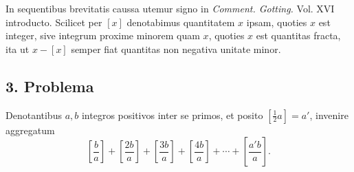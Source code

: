 \documentclass[12pt]{article}
\begin{document}
In sequentibus brevitatis caussa utemur signo in \emph{Comment. Gotting.} Vol. XVI introducto. Scilicet per $[x]$ denotabimus quantitatem $x$ ipsam, quoties $x$ est integer, sive integrum proxime minorem quam $x$, quoties $x$ est quantitas fracta, ita ut $x-[x]$ semper fiat quantitas non negativa unitate minor.

\subsection*{3. Problema}

Denotantibus $a,b$ integros positivos inter se primos, et posito $\left[\frac12a\right]=a'$, invenire aggregatum
\[
\left[\frac{b}{a}\right]+\left[\frac{2b}{a}\right]+\left[\frac{3b}{a}\right]+\left[\frac{4b}{a}\right]+\cdots+\left[\frac{a'b}{a}\right].
\]
\end{document}
